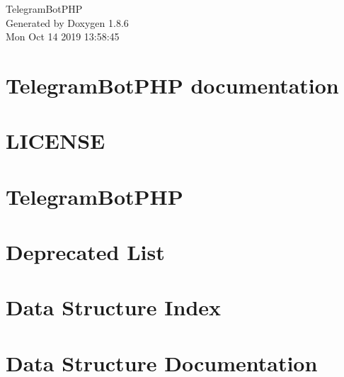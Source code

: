 \documentclass[twoside]{book}
\newcommand{\clearemptydoublepage}{%
  \newpage{\pagestyle{empty}\cleardoublepage}%
}
\begin{document}
\hypersetup{pageanchor=false}
\begin{titlepage}
\vspace*{7cm}
\begin{center}%
{\Large Telegram\-Bot\-P\-H\-P }\\
\vspace*{1cm}
{\large Generated by Doxygen 1.8.6}\\
\vspace*{0.5cm}
{\small Mon Oct 14 2019 13:58:45}\\
\end{center}
\end{titlepage}
\clearemptydoublepage
\tableofcontents
\clearemptydoublepage
{}
\hypersetup{pageanchor=true}

\chapter{Telegram\-Bot\-P\-H\-P documentation}
\label{index}\hypertarget{index}{}
\chapter{L\-I\-C\-E\-N\-S\-E}
\label{md__home_travis_build__eleirbag89__telegram_bot_p_h_p__l_i_c_e_n_s_e}
\hypertarget{md__home_travis_build__eleirbag89__telegram_bot_p_h_p__l_i_c_e_n_s_e}{}

\chapter{Telegram\-Bot\-P\-H\-P}
\label{md__home_travis_build__eleirbag89__telegram_bot_p_h_p__r_e_a_d_m_e}
\hypertarget{md__home_travis_build__eleirbag89__telegram_bot_p_h_p__r_e_a_d_m_e}{}

\chapter{Deprecated List}
\label{deprecated}
\hypertarget{deprecated}{}

\chapter{Data Structure Index}

\chapter{Data Structure Documentation}



\newpage
{}
{}
\printindex
\end{document}
